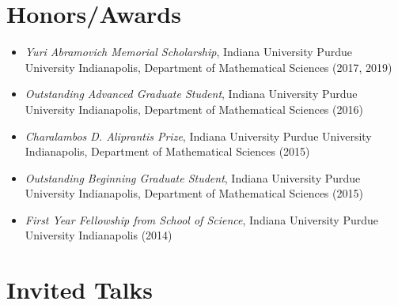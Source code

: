 \documentclass[11pt,letterpaper,roman,colorlinks,urlcolor=blue,linkcolor=blue
]{moderncv}
\begin{document}
\section{Honors/Awards}
\begin{itemize}[parsep=-0.2em, leftmargin=3.55cm]
    \item \textit{Yuri Abramovich Memorial Scholarship}, Indiana University Purdue University Indianapolis, Department of Mathematical Sciences (2017, 2019)
    \item \textit{Outstanding Advanced Graduate Student}, Indiana University Purdue University Indianapolis, Department of Mathematical Sciences (2016)
    \item \textit{Charalambos D. Aliprantis Prize}, Indiana University Purdue University Indianapolis, Department of Mathematical Sciences (2015)
    \item \textit{Outstanding Beginning Graduate Student}, Indiana University Purdue University Indianapolis, Department of Mathematical Sciences (2015)
    \item \textit{First Year Fellowship from School of Science}, Indiana University Purdue University Indianapolis (2014)
\end{itemize}



\section{Invited Talks}





\end{document}
